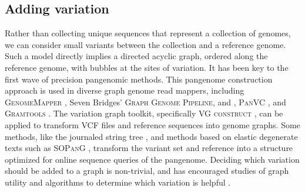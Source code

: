 
\subsection{Adding variation}

Rather than collecting unique sequences that represent a collection of genomes, we can consider small variants between the collection and a reference genome.
Such a model directly implies a directed acyclic graph, ordered along the reference genome, with bubbles at the sites of variation.
It has been key to the first wave of precision pangenomic methods.
This pangenome construction approach is used in diverse graph genome read mappers, including \textsc{GenomeMapper} \cite{Schneeberger_2009}, Seven Bridges' \textsc{Graph Genome Pipeline}, and \cite{Rakocevic_2019}, \textsc{PanVC} \cite{Valenzuela_2018}, and \textsc{Gramtools} \cite{Maciuca_2016}.
The variation graph toolkit, specifically \textsc{VG construct} \cite{Garrison_2018}, can be applied to transform VCF files and reference sequences into genome graphs.
Some methods, like the journaled string tree \cite{Rahn_2014}, and methods based on elastic degenerate texts \cite{Bernardini_2019} such as \textsc{SOPanG} \cite{Cis_ak_2018}, transform the variant set and reference into a structure optimized for online sequence queries of the pangenome.
Deciding which variation should be added to a graph is non-trivial, and has encouraged studies of graph utility \cite{Novak_2017a} and algorithms to determine which variation is helpful \cite{Pritt_2018}.





